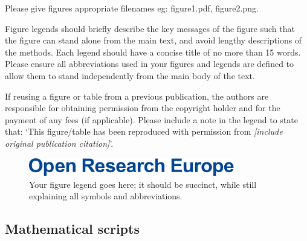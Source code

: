 \documentclass[10pt,a4paper]{article}
\begin{document}
Please give figures appropriate filenames eg: figure1.pdf, figure2.png.

Figure legends should briefly describe the key messages of the figure such that the figure can stand alone from the main text, and avoid lengthy descriptions of the methods. Each legend should have a concise title of no more than 15 words. Please ensure all abbreviations used in your figures and legends are defined to allow them to stand independently from the main body of the text.

If reusing a figure or table from a previous publication, the authors are responsible for obtaining permission from the copyright holder and for the payment of any fees (if applicable). Please include a note in the legend to state that: ‘This figure/table has been reproduced with permission from \textit{[include original publication citation]}’.

\begin{figure}
	\centering
	\includegraphics[width=0.8\textwidth]{ORE Header.png}
	\caption{\label{fig:your-figure}Your figure legend goes here; it should be succinct, while still explaining all symbols and abbreviations. }
\end{figure}

\subsection*{Mathematical scripts}
\end{document}
